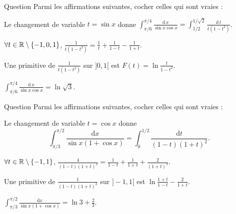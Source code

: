 \begin{multi}{Question}
Parmi les affirmations suivantes, cocher celles qui sont vraies :

    \item* Le changement de variable \(t=\sin x\) donne \(\displaystyle \int _{\pi/6}^{\pi/4}\frac{\mathrm{d}\, x}{\sin x\cos x}=\int _{1/2}^{1/\sqrt{2}}\frac{\mathrm{d}\, t}{t(1-t^2)}\).
    \item \(\forall t\in \mathbb{R}\setminus \{-1,0,1\}\), \(\displaystyle \frac{1}{t(1-t^2)}=\frac{1}{t}+\frac{1}{1-t}-\frac{1}{1+t}\).
    \item Une primitive de \(\displaystyle \frac{1}{t(1-t^2)}\) sur \(]0,1[\) est \(\displaystyle F(t)=\ln \frac{t}{1-t^2}\).
    \item* \(\displaystyle \int _{\pi/6}^{\pi/4}\frac{\mathrm{d}\, x}{\sin x\cos x}=\ln \sqrt{3}\).
\end{multi}


\begin{multi}{Question}
Parmi les affirmations suivantes, cocher celles qui sont vraies :

    \item* Le changement de variable \(t=\cos x\) donne
\[\displaystyle \int _{\pi/3}^{\pi/2}\frac{\mathrm{d}x}{\sin x(1+\cos x)}=\int _0^{1/2}\frac{\mathrm{d}t}{(1-t)(1+t)^2}.\]
    \item* \(\forall t\in \mathbb{R}\setminus \{-1,1\}\), \(\displaystyle \frac{4}{(1-t)(1+t)^2}=\frac{1}{1-t}+\frac{1}{1+t}+\frac{2}{(1+t)^2}\).
    \item Une primitive de \(\displaystyle \frac{1}{(1-t)(1+t)^2}\) sur \(]-1,1[\) est \(\displaystyle \ln \frac{1+t}{1-t}-\frac{2}{1+t}\).
    \item \(\displaystyle \int _{\pi/3}^{\pi/2}\frac{\mathrm{d}x}{\sin x(1+\cos x)}=\ln 3+\frac{2}{3}\).
\end{multi}


